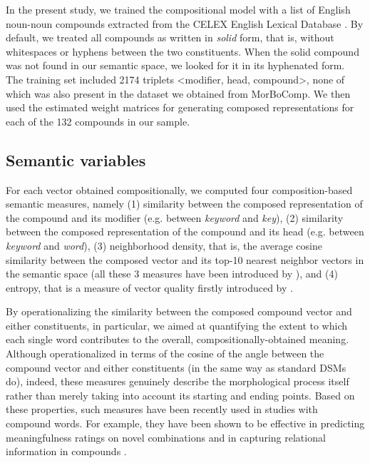 \documentclass[output=paper]{langsci/langscibook}
\begin{document}
In the present study, we trained the compositional model with a list of English noun-noun compounds extracted from the CELEX English Lexical Database \citep{celex}. By default, we treated all compounds as written in \emph{solid} form, that is, without whitespaces or hyphens between the two constituents. When the solid compound was not found in our semantic space, we looked for it in its hyphenated form. The training set included 2174 triplets <modifier, head, compound>, none of which was also present in the dataset we obtained from MorBoComp. We then used the estimated weight matrices for generating composed representations for each of the 132 compounds in our sample.


\subsection{Semantic variables}

For each vector obtained compositionally, we computed four composition-based semantic measures, namely (1) similarity between the composed representation of the compound and its modifier (e.g. between \emph{keyword} and \emph{key}), (2) similarity between the composed representation of the compound and its head (e.g. between \emph{keyword} and \emph{word}), (3) neighborhood density, that is, the average cosine similarity between the composed vector and its top-10 nearest neighbor vectors in the semantic space (all these 3 measures have been introduced by \citealt{vecchi2011}), and (4) entropy, that is a measure of vector quality firstly introduced by \cite{lazaridoufish}.

By operationalizing the similarity between the composed compound vector and either constituents, in particular, we aimed at quantifying the extent to which each single word contributes to the overall, compositionally-obtained meaning. Although operationalized in terms of the cosine of the angle between the compound vector and either constituents (in the same way as standard DSMs do), indeed, these measures genuinely describe the morphological process itself rather than merely taking into account its starting and ending points. Based on these properties, such measures have been recently used in studies with compound words. For example, they have been shown to be effective in predicting meaningfulness ratings on novel combinations \citep{gunther2016} and in capturing relational information in compounds \citep{marelli2017}.
\end{document}
